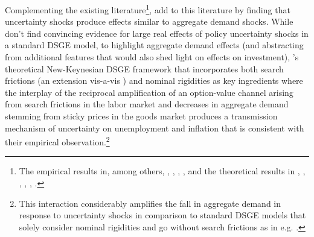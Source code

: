 \documentclass[a4paper,11pt,listof=nochaptergap,oneside,pointednumbers,bibtotoc,bigheadings,liststotoc,hidelinks]{scrbook}
\theoremstyle{mysatz}
\theoremstyle{mydefinition}
\theoremstyle{mytheorem}
\theoremstyle{mybemerkung}
\begin{document}
Complementing the existing literature\footnote{The empirical results in, among others, \citet{bloom:09}, \citet{bloometal:12}, \citet{juradoetal:15}, \citet{scotti:16}, \citet{bachmannetal:13} and the theoretical results in \citet{bloom:09}, \citet{gilchristetal:14}, \citet{arenalloetal:11}, \citet{basuandbundick:17}, \citet{bloometal:12}, \citet{bornandpfeifer:14}.}, \citet{leducandliu:16} add to this literature by finding that uncertainty shocks produce effects similar to aggregate demand shocks. While \citet{bornandpfeifer:14} don't find convincing evidence for large real effects of policy uncertainty shocks in a standard DSGE model, to highlight aggregate demand effects (and abstracting from additional features that would also shed light on effects on investment), \citet{leducandliu:16}'s theoretical New-Keynesian DSGE framework that incorporates both search frictions (an extension vis-a-vis \citealp{basuandbundick:17}) and nominal rigidities as key ingredients where the interplay of the reciprocal amplification of an option-value channel arising from search frictions in the labor market and decreases in aggregate demand stemming from sticky prices in the goods market produces a transmission mechanism of uncertainty on unemployment and inflation that is consistent with their empirical observation.\footnote{This interaction considerably amplifies the fall in aggregate demand in response to uncertainty shocks in comparison to standard DSGE models that solely consider nominal rigidities and go without search frictions as in e.g. \citet{basuandbundick:17}.} 
\end{document}

